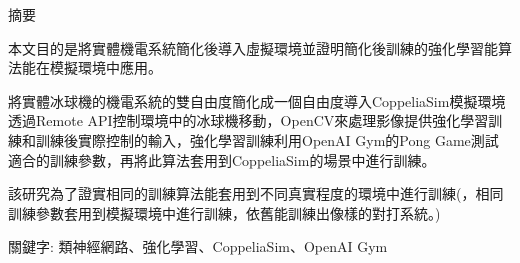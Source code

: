 \begin{center}
\fontsize{11pt}{0}\sectionef
摘要
\end{center}
\begin{flushleft}
\qquad 本文目的是將實體機電系統簡化後導入虛擬環境並證明簡化後訓練的強化學習能算法能在模擬環境中應用。

\qquad 將實體冰球機的機電系統的雙自由度簡化成一個自由度導入CoppeliaSim模擬環境透過Remote API控制環境中的冰球機移動，OpenCV來處理影像提供強化學習訓練和訓練後實際控制的輸入，強化學習訓練利用OpenAI Gym的Pong Game測試適合的訓練參數，再將此算法套用到CoppeliaSim的場景中進行訓練。

\qquad 該研究為了證實相同的訓練算法能套用到不同真實程度的環境中進行訓練(，相同訓練參數套用到模擬環境中進行訓練，依舊能訓練出像樣的對打系統。)

\end{flushleft}
\begin{center}
\fontsize{10pt}{20pt}\selectfont 關鍵字: 類神經網路、強化學習、\sectionef CoppeliaSim、OpenAI Gym
\end{center}